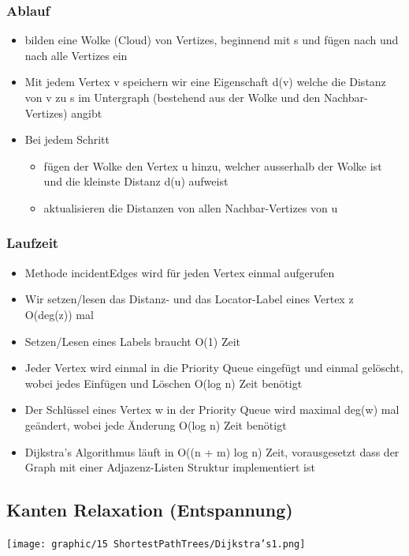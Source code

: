 \subsubsection{Ablauf}
\begin{itemize}
    \item bilden eine Wolke (Cloud) von Vertizes, beginnend mit s und fügen nach und nach alle Vertizes ein
    \item Mit jedem Vertex v speichern wir eine Eigenschaft d(v) welche die Distanz von v zu s im Untergraph (bestehend aus der Wolke und den Nachbar-Vertizes) angibt
    \item Bei jedem Schritt
    \begin{itemize}
        \item fügen der Wolke den Vertex u hinzu, welcher ausserhalb der Wolke ist und die kleinste Distanz d(u) aufweist
        \item aktualisieren die Distanzen von allen Nachbar-Vertizes von u
    \end{itemize}
\end{itemize}

\subsubsection{Laufzeit}
\begin{itemize}
    \item Methode incidentEdges wird für jeden Vertex einmal aufgerufen
    \item Wir setzen/lesen das Distanz- und das Locator-Label eines Vertex z O(deg(z)) mal
    \item Setzen/Lesen eines Labels braucht O(1) Zeit
    \item Jeder Vertex wird einmal in die Priority Queue eingefügt und einmal gelöscht, wobei jedes Einfügen und Löschen O(log n) Zeit benötigt
    \item Der Schlüssel eines Vertex w in der Priority Queue wird maximal deg(w) mal geändert, wobei jede Änderung O(log n) Zeit benötigt
    \item Dijkstra’s Algorithmus läuft in O((n + m) log n) Zeit, vorausgesetzt dass der Graph mit einer Adjazenz-Listen Struktur implementiert ist
\end{itemize}
\subsection{Kanten Relaxation (Entspannung)}
\begin{center}
    \texttt{[image: graphic/15 ShortestPathTrees/Dijkstra’s1.png]}
\end{center}
\vspace{-8pt}


